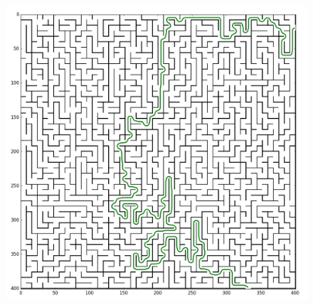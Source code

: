 \documentclass{article}
\begin{document}
 \begin{figure}
 	\begin{center}
 		\includegraphics[scale=0.3]{../result/maze6_C.png}
 	\end{center}
 \end{figure}
\end{document}
